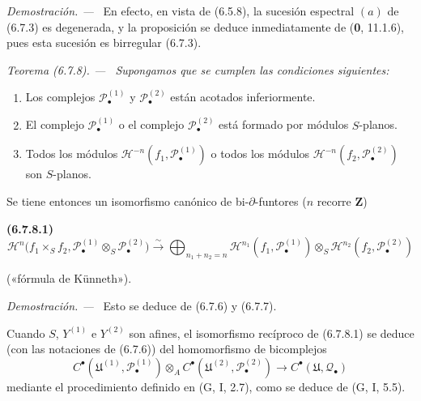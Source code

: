 \documentclass[10pt,oneside]{book}
\newcommand{\oldpage}[2][]{\setcounter{footnote}{0}\marginpar{\scriptsize\textbf{#1}~|~#2}\ignorespaces}
\newenvironment{env}[1][]{\par\medskip\noindent\textbf{(#1)}\ }{\par}
\newenvironment{theorem}[1][]{\par\medskip\noindent\itshape Teorema (#1). ---\ }{\par}
\newenvironment{proof}{\par\medskip\noindent\textit{Demostración. ---\ }}{\par}
\begin{document}
\begin{proof}
En efecto, en vista de (6.5.8), la sucesión espectral $(a)$ de (6.7.3) es
degenerada, y la proposición se deduce inmediatamente de
(\textbf{0}, 11.1.6), pues esta sucesión es birregular (6.7.3).
\end{proof}

\begin{theorem}[6.7.8]
\label{III.6.7.8}
Supongamos que se cumplen las condiciones siguientes:
\begin{enumerate}
  \item[{$1^\circ$}]
    Los complejos $\mathscr P_\bullet^{(1)}$ y
    $\mathscr P_\bullet^{(2)}$ están acotados inferiormente.
  \item[{$2^\circ$}]
    El complejo $\mathscr P_\bullet^{(1)}$ \textup{o} el complejo
    $\mathscr P_\bullet^{(2)}$ está formado por módulos $S$-planos.

  \item[{$3^\circ$}]
    \oldpage[III]{162}
    Todos los módulos $\mathscr H^{-n}(f_1,\mathscr P_\bullet^{(1)})$ \textup{o} todos
    los módulos $\mathscr H^{-n}(f_2,\mathscr P_\bullet^{(2)})$ son
    $S$-planos.
\end{enumerate}
Se tiene entonces un isomorfismo canónico de bi-$\partial$-funtores
($n$ recorre $\mathbf Z$)
\begin{env}[6.7.8.1]
\label{III.6.7.8.1}
\[
  \mathscr H^n\bigl(f_1\times_S f_2,
    \mathscr P_\bullet^{(1)}\otimes_S\mathscr P_\bullet^{(2)}\bigr)
  \xrightarrow{\sim}
  \bigoplus_{n_1+n_2=n}
  \mathscr H^{n_1}(f_1,\mathscr P_\bullet^{(1)})
  \otimes_S
  \mathscr H^{n_2}(f_2,\mathscr P_\bullet^{(2)})
  \tag{6.7.8.1}\label{III.6.7.8.1.eq}
\]
\end{env}
(«fórmula de Künneth»).
\end{theorem}

\begin{proof}
Esto se deduce de (6.7.6) y (6.7.7).

Cuando $S$, $Y^{(1)}$ e $Y^{(2)}$ son afines, el isomorfismo recíproco de
(6.7.8.1) se deduce (con las notaciones de (6.7.6)) del homomorfismo de
bicomplejos
\[
  C^\bullet(\mathfrak U^{(1)},\mathscr P_\bullet^{(1)})
  \otimes_A
  C^\bullet(\mathfrak U^{(2)},\mathscr P_\bullet^{(2)})
  \longrightarrow
  C^\bullet(\mathfrak U,\mathscr Q_\bullet)
\]
mediante el procedimiento definido en (G, I, 2.7), como se deduce de
(G, I, 5.5).
\end{proof}
\end{document}
